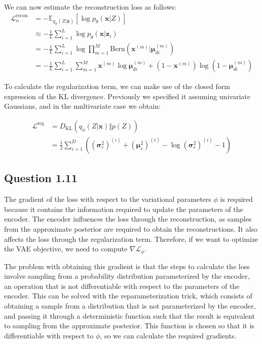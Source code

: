 \documentclass{article}
\begin{document}
We can now estimate the reconstruction loss as follows:
\begin{align*}
\mathcal{L}_n^{\text{recon}} &= -\mathbb{E}_{q_\phi(Z\vert\mathbf{x})}[\log p_\theta(\mathbf{x}\vert Z)] \\
&\approx -\frac{1}{L}\sum_{i=1}^L \log p_\theta(\mathbf{x}\vert \mathbf{z}_i) \\
&=
-\frac{1}{L}\sum_{i=1}^L\log \prod_{m=1}^M \text{Bern}(\mathbf{x}^{(m)}\vert \boldsymbol{\mu}_{di}^{(m)}) \\
&=
-\frac{1}{L}\sum_{i=1}^L\sum_{m=1}^M \mathbf{x}^{(m)}\log\boldsymbol{\mu}_{di}^{(m)} + (1-\mathbf{x}^{(m)})\log(1 -\boldsymbol{\mu}_{di}^{(m)})
\end{align*}

To calculate the regularization term, we can make use of the closed form expression of the KL divergence. Previously we specified it assuming univariate Gaussians, and in the multivariate case we obtain:

\begin{align*}
\mathcal{L}^{\text{reg}} &= \mathcal{} D_\text{KL}(q_\phi(Z\vert\mathbf{x})\Vert p(Z)) \\
&=
\frac{1}{2}\sum_{i=1}^D ((\boldsymbol{\sigma}_e^2)^{(i)} + (\boldsymbol{\mu}_e^2)^{(i)} - \log(\boldsymbol{\sigma}_e^2)^{(i)} - 1)
\end{align*}

\subsection*{Question 1.11}

The gradient of the loss with respect to the variational parameters $\phi$ is required because it contains the information required to update the parameters of the encoder. The encoder influences the loss through the reconstruction, as samples from the approximate posterior are required to obtain the reconstructions. It also affects the loss through the regularization term. Therefore, if we want to optimize the VAE objective, we need to compute $\nabla\mathcal{L}_\phi$.

The problem with obtaining this gradient is that the steps to calculate the loss involve sampling from a probability distribution parameterized by the encoder, an operation that is not differentiable with respect to the parameters of the encoder. This can be solved with the reparameterization trick, which consists of obtaining a sample from a distribution that is not parameterized by the encoder, and passing it through a deterministic function such that the result is equivalent to sampling from the approximate posterior. This function is chosen so that it is differentiable with respect to $\phi$, so we can calculate the required gradients.
\end{document}
